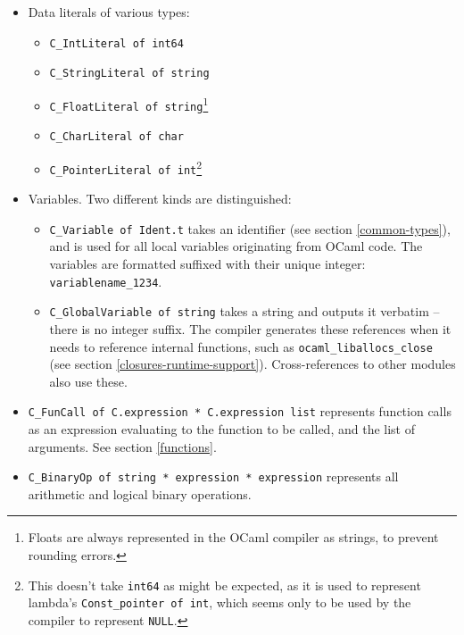\documentclass[12pt,a4paper,twoside,openright]{report}
\begin{document}
\begin{itemize}
    \begin{itemize}
        \item Data literals of various types:
            \begin{itemize}
                \item \lstinline!C_IntLiteral of int64!
                \item \lstinline!C_StringLiteral of string!
                \item \lstinline!C_FloatLiteral of string!\footnote{Floats are
                    always represented in the OCaml compiler as strings, to
                    prevent rounding errors.}
                \item \lstinline!C_CharLiteral of char!
                \item \lstinline!C_PointerLiteral of int!\footnote{This
                    doesn't take \lstinline!int64! as might be expected, as it
                    is used to represent lambda's \lstinline!Const_pointer of int!,
                    which seems only to be used by the compiler to represent
                    \lstinline!NULL!.}
            \end{itemize}
        \item Variables. Two different kinds are distinguished:
          \begin{itemize}
            \item \lstinline!C_Variable of Ident.t! takes an identifier (see section
              \ref{common-types}), and is used for all local variables
              originating from OCaml code. The variables are formatted suffixed
              with their unique integer: \lstinline!variablename_1234!.
            \item \lstinline!C_GlobalVariable of string! takes a string and
              outputs it verbatim -- there is no integer suffix. The compiler
              generates these references when it needs to reference internal
              functions, such as \lstinline!ocaml_liballocs_close! (see section
              \ref{closures-runtime-support}). Cross-references to other
              modules also use these.
          \end{itemize}
        \item \lstinline!C_FunCall of C.expression * C.expression list!
            represents function calls as an expression evaluating to the
            function to be called, and the list of arguments. See section \ref{functions}.
        \item \lstinline!C_BinaryOp of string * expression * expression!
            represents all arithmetic and logical binary operations.
    \end{itemize}


\end{itemize}
\end{document}
